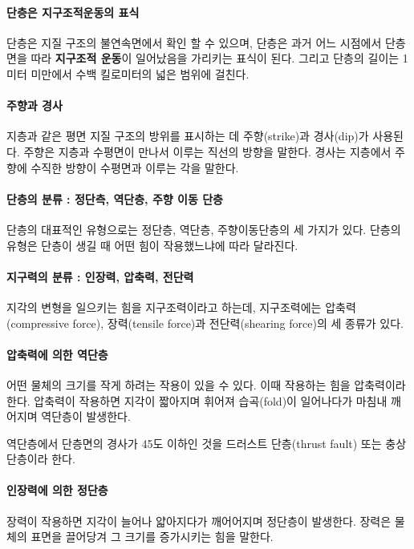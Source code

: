 \documentclass[12pt, a4paper, oneside]{book}
\begin{document}
		\paragraph{단층은 지구조적운동의 표식}
		단층은 지질 구조의 불연속면에서 확인 할 수 있으며, 
		단층은 과거 어느 시점에서 단층면을 따라 \textbf{지구조적 운동}이 일어났음을 가리키는 표식이 된다.
		그리고 단층의 길이는 1미터 미만에서 수백 킬로미터의 넓은 범위에 걸친다.
			
		\paragraph{주향과 경사}
		지층과 같은 평면 지질 구조의 방위를 표시하는 데 주향(strike)과 경사(dip)가 사용된다.
		주향은 지층과 수평면이 만나서 이루는 직선의 방향을 말한다.
		경사는 지층에서 주향에 수직한 방향이 수평면과 이루는 각을 말한다.
		
		\paragraph{단층의 분류 : 정단측, 역단층, 주향 이동 단층}
		단층의 대표적인 유형으로는 정단층, 역단층, 주향이동단층의 세 가지가 있다.
		단층의 유형은 단층이 생길 때 어떤 힘이 작용했느냐에 따라 달라진다.
		
		\paragraph{지구력의 분류 : 인장력, 압축력, 전단력}
		지각의 변형을 일으키는 힘을 지구조력이라고 하는데, 
		지구조력에는 압축력(compressive force), 장력(tensile force)과 전단력(shearing force)의 세 종류가 있다.

		\paragraph{압축력에 의한 역단층}
		어떤 물체의 크기를 작게 하려는 작용이 있을 수 있다.
		이때 작용하는 힘을 압축력이라 한다.
		압축력이 작용하면 지각이 짧아지며 휘어져 습곡(fold)이 일어나다가 마침내 깨어지며 역단층이 발생한다.

		역단층에서 단층면의 경사가 45도 이하인 것을 드러스트 단층(thrust fault) 또는 충상 단층이라 한다.
		
		\paragraph{인장력에 의한 정단층}
		장력이 작용하면 지각이 늘어나 얇아지다가 깨어어지며 정단층이 발생한다.
		장력은 물체의 표면을 끌어당겨 그 크기를 증가시키는 힘을 말한다.
			
\end{document}
